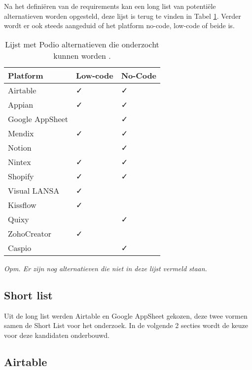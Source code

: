 Na het definiëren van de requirements kan een long list van potentiële alternatieven worden opgesteld, deze lijst is terug te vinden in Tabel \ref{tab:Tabel 3}. Verder wordt er ook steeds aangeduid of het platform no-code, low-code of beide is.
\begin{table}[ht]
    \centering
    \caption{\label{tab:Tabel 3} Lijst met Podio alternatieven die onderzocht kunnen worden \autocite{Tasmia2022}.}
    \begin{tabular}{ | p{5cm} | p{2cm} | p{2cm} | }
        \hline
        \textbf{Platform}   & \textbf{Low-code} & \textbf{No-Code} \\
        \hline\hline
        Airtable            & ✓ & ✓ \\
        Appian              & ✓ & ✓ \\
        Google AppSheet      &    & ✓ \\
        Mendix              & ✓ & ✓ \\
        Notion              &    & ✓ \\
        Nintex              & ✓ & ✓ \\
        Shopify             & ✓ & ✓ \\
        Visual LANSA        & ✓ &    \\
        Kissflow            & ✓ &    \\
        Quixy               &    & ✓ \\
        ZohoCreator         & ✓ &    \\
        Caspio              &    & ✓ \\
        \hline
    \end{tabular}
    
    {\raggedright \textit{Opm. Er zijn nog alternatieven die niet in deze lijst vermeld staan.} \par}
\end{table}

\subsection{Short list}

Uit de long list werden Airtable en Google AppSheet gekozen, deze twee vormen samen de Short List voor het onderzoek. In de volgende 2 secties wordt de keuze voor deze kandidaten onderbouwd. 

\subsection{Airtable} %



